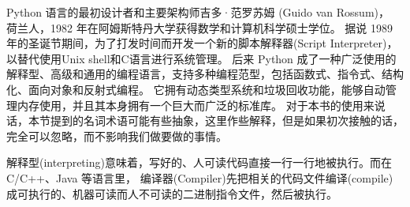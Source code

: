 \documentclass[main.tex]{subfiles}
\begin{document}
Python 语言的最初设计者和主要架构师吉多·范罗苏姆 (Guido van Rossum)， 荷兰人，1982 年在阿姆斯特丹大学获得数学和计算机科学硕士学位。
据说 1989 年的圣诞节期间，为了打发时间而开发一个新的脚本解释器(Script Interpreter)，以替代使用Unix shell和C语言进行系统管理。
后来 Python 成了一种广泛使用的解释型、高级和通用的编程语言，支持多种编程范型，包括函数式、指令式、结构化、面向对象和反射式编程。
它拥有动态类型系统和垃圾回收功能，能够自动管理内存使用，并且其本身拥有一个巨大而广泛的标准库。
对于本书的使用来说话，本节提到的名词术语可能有些抽象，这里作些解释，但是如果初次接触的话，完全可以忽略，而不影响我们做要做的事情。

解释型(interpreting)意味着，写好的、人可读代码直接一行一行地被执行。而在 C/C++、Java 等语言里， 编译器(Compiler)先把相关的代码文件编译(compile)
成可执行的、机器可读而人不可读的二进制指令文件，然后被执行。
\end{document}
